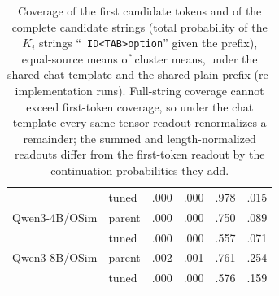 \begin{table}[t]
\begin{tabular}{@{}llcccc@{}}
 & tuned & .000 & .000 & .978 & .015 \\
Qwen3-4B/OSim & parent & .000 & .000 & .750 & .089 \\
 & tuned & .000 & .000 & .557 & .071 \\
Qwen3-8B/OSim & parent & .002 & .001 & .761 & .254 \\
 & tuned & .000 & .000 & .576 & .159 \\
\bottomrule
\end{tabular}
\caption{Coverage of the first candidate tokens and of the complete candidate strings (total probability of the $K_i$ strings ``\texttt{ ID<TAB>option}'' given the prefix), equal-source means of cluster means, under the shared chat template and the shared plain prefix (re-implementation runs). Full-string coverage cannot exceed first-token coverage, so under the chat template every same-tensor readout renormalizes a remainder; the summed and length-normalized readouts differ from the first-token readout by the continuation probabilities they add.}
\label{tab:fullstring-coverage}
\end{table}
